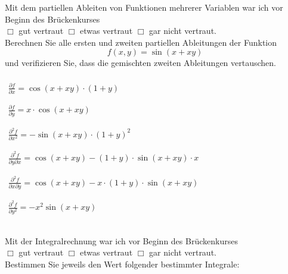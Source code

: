 \documentclass[12pt,answers]{exam}
\begin{document}
\begin{questions}
Mit dem partiellen Ableiten von Funktionen mehrerer Variablen war ich vor Beginn des Brückenkurses\\ $\Box$ gut vertraut \hfill $\Box$ etwas vertraut \hfill $\Box$ gar nicht vertraut. \\[2ex]
Berechnen Sie alle ersten und zweiten partiellen Ableitungen der Funktion
\[
f(x,y)=\sin(x+xy)
\]
und verifizieren Sie, dass die gemischten zweiten Ableitungen vertauschen.
\begin{solution}
\[\begin{array}{ll} ~~\\ 
\displaystyle\frac{\partial f}{\partial x}= \cos(x+xy)\cdot (1+y)\\ ~~\\~~\\
\displaystyle\frac{\partial f}{\partial y}= x\cdot\cos(x+xy) \\ ~~\\~~\\
\displaystyle\frac{\partial^2 f}{\partial x^2}= -\sin(x+xy)\cdot(1+y)^2 \\ ~~\\~~\\
\displaystyle\frac{\partial^2 f}{\partial y\partial x}= \cos(x+xy)-(1+y)\cdot \sin(x+xy)\cdot x \\~~\\ ~~\\
\displaystyle\frac{\partial^2 f}{\partial x\partial y}= \cos(x+xy)-
x\cdot(1+y)\cdot\sin(x+xy)\\ ~~\\~~\\
\displaystyle\frac{\partial^2 f}{\partial y^2}= -x^2\sin(x+xy)\\ ~~\\~~\\
\end{array}~~~~~~~~~~~~~~~~~~~~~~~~~~~~~~~~~~~~~~~~~~~~~~~~~~~~~~~~~~~~~~~~~~~~
\]
\end{solution}
\pagebreak
{}

Mit der Integralrechnung war ich vor Beginn des Brückenkurses\\ $\Box$ gut vertraut \hfill $\Box$ etwas vertraut \hfill $\Box$ gar nicht vertraut. \\[2ex]
Bestimmen Sie jeweils den Wert folgender bestimmter Integrale:\\
\begin{solution}
\begin{parts}


\end{parts}
\end{solution}
\end{questions}
\end{document}
